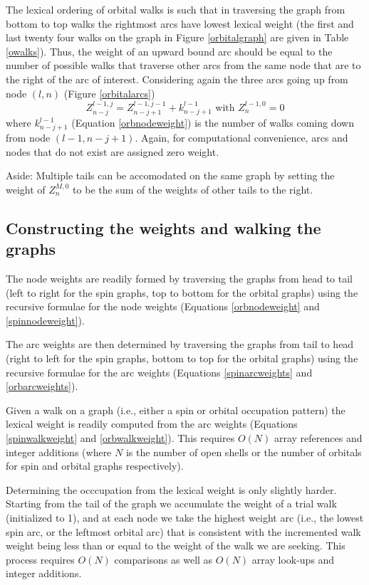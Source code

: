 The lexical ordering of orbital walks is such that in traversing the
graph from bottom to top walks the rightmost arcs have lowest lexical
weight (the first and last twenty four walks on the graph in Figure
\ref{orbitalgraph} are given in Table \ref{owalks}).
Thus, the weight of an upward bound arc should be equal to the number
of possible walks that traverse other arcs from the same node that are
to the right of the arc of interest.  Considering again the three arcs
going up from node $(l,n)$ (Figure \ref{orbitalarcs}) 
\begin{equation}
  Z^{l-1,j}_{n-j} = Z^{l-1,j-1}_{n-j+1} + k^{l-1}_{n-j+1} \mbox{\ with\ }
  Z^{l-1,0}_n = 0 \label{orbarcweights}
\end{equation}
where $k^{l-1}_{n-j+1}$ (Equation \ref{orbnodeweight}) is the number of
walks coming down from node $(l-1,n-j+1)$.  Again, for computational
convenience, arcs and nodes that do not exist are assigned zero
weight. 

Aside: Multiple tails can be accomodated on the same graph by setting
the weight of $Z^{M,0}_n$ to be the sum of the weights of other tails
to the right.

\subsection{Constructing the weights and walking the graphs}

The node weights are readily formed by traversing the graphs from head
to tail (left to right for the spin graphs, top to bottom for the
orbital graphs) using the recursive formulae for the node weights
(Equations \ref{orbnodeweight} and \ref{spinnodeweight}). 

The arc weights are then determined by traversing the graphs from tail
to head (right to left for the spin graphs, bottom to top for the
orbital graphs) using the recursive formulae for the arc weights
(Equations \ref{spinarcweights} and \ref{orbarcweights}).

Given a walk on a graph (i.e., either a spin or orbital occupation
pattern) the lexical weight is readily computed from the arc weights
(Equations \ref{spinwalkweight} and \ref{orbwalkweight}). This
requires $O(N)$ array references and integer additions (where $N$ is
the number of open shells or the number of orbitals for spin and
orbital graphs respectively).

Determining the occcupation from the lexical weight is only slightly
harder.  Starting from the tail of the graph we accumulate the weight
of a trial walk (initialized to 1), and at each node we take the
highest weight arc (i.e., the lowest spin arc, or the leftmost orbital
arc) that is consistent with the incremented walk weight being less
than or equal to the weight of the walk we are seeking.  This process
requires $O(N)$ comparisons as well as $O(N)$ array look-ups and
integer additions.


